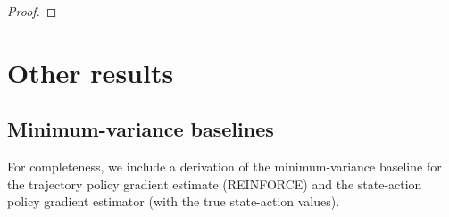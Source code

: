 \begin{proof}



\end{proof}


\section{Other results}
\label{app:other_results}
\subsection{Minimum-variance baselines}
\label{app:optimal_baseline}
For completeness, we include a derivation of the minimum-variance baseline for the trajectory policy gradient estimate (REINFORCE) and the state-action policy gradient estimator (with the true state-action values).

